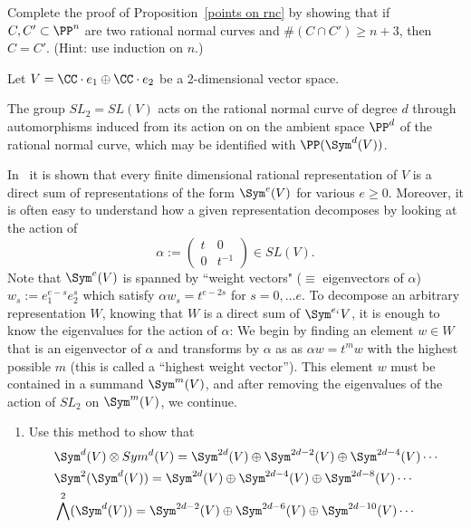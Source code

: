 \begin{exercise}\label{Castelnuovo uniqueness}
Complete the proof of Proposition~\ref{points on rnc} by showing that if $C, C' \subset \PP^n$ are two rational normal curves and $\#(C \cap C') \geq n+3$, then $C = C'$. (Hint: use induction on $n$.)
\end{exercise}


\begin{exercise}\label{rnc and representations}
Let $V = \CC\cdot e_1\oplus \CC\cdot e_2$ be a 2-dimensional vector space. 

The group $SL_2= SL(V)$ acts on the rational normal curve of degree $d$ through automorphisms induced from its action on
 on the ambient space $\PP^d$ of the rational normal curve, which may be identified with $\PP(\Sym^d(V))$.

In~\cite[pp. 146--150]{Fulton-Harris} it is shown that
 every finite dimensional rational 
representation of $V$ is a direct sum of representations of the form $\Sym^e(V)$ for various $e\geq 0$. Moreover, it is often easy to understand
how a given representation decomposes by looking at the action of
$$
\alpha := \begin{pmatrix}
t&0\\
0&t^{-1}
\end{pmatrix}
\in SL(V).
$$
Note that $\Sym^e(V)$ is spanned by ``weight vectors" ($\equiv$ eigenvectors of $\alpha$) $w_s := e_1^{e-s} e_2^{s}$ 
which satisfy $\alpha w_s = t^{e-2s}$ for $s = 0, \dots e$.
To decompose an arbitrary representation $W$, knowing that $W$ is a direct sum of $\Sym^{e_i}V$, it is enough to know the 
eigenvalues for the action of $\alpha$: We begin by finding an element $w\in W$ that
is an eigenvector of $\alpha$ and transforms by $\alpha$ as
as $\alpha w = t^mw$ with the highest possible $m$ (this is called a ``highest weight vector''). This element $w$ must be contained
in a summand $\Sym^m(V)$, and after removing the eigenvalues of the action of $SL_2$ on $\Sym^m(V)$, we continue. 
\begin{enumerate}
 \item Use this method to show that 
\begin{align*}
&\Sym^d(V)\otimes Sym^d(V)= \Sym^{2d}(V) \oplus  \Sym^{2d-2}(V) \oplus \Sym^{2d-4}(V) \cdots\\
 &\Sym^2(\Sym^d(V))= \Sym^{2d}(V) \oplus \Sym^{2d-4}(V)\oplus \Sym^{2d-8}(V) \cdots\\
 &\bigwedge^2(\Sym^d(V))= \Sym^{2d-2}(V) \oplus \Sym^{2d-6}(V)\oplus \Sym^{2d-10}(V) \cdots
\end{align*}

\end{enumerate}
\end{exercise}
